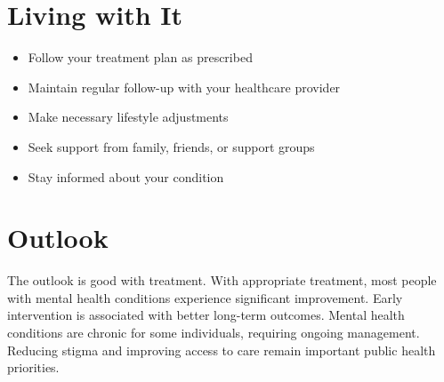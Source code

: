 \section{Living with It}
\begin{itemize}[noitemsep]
  \item Follow your treatment plan as prescribed
  \item Maintain regular follow-up with your healthcare provider
  \item Make necessary lifestyle adjustments
  \item Seek support from family, friends, or support groups
  \item Stay informed about your condition
\end{itemize}
\section{Outlook}
The outlook is good with treatment. With appropriate treatment, most people with mental health conditions experience significant improvement. Early intervention is associated with better long-term outcomes. Mental health conditions are chronic for some individuals, requiring ongoing management. Reducing stigma and improving access to care remain important public health priorities.

